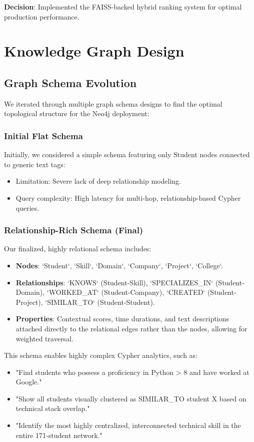 \documentclass[12pt,a4paper]{report}
\begin{document}
\textbf{Decision}: Implemented the FAISS-backed hybrid ranking system for optimal production performance.

\section{Knowledge Graph Design}

\subsection{Graph Schema Evolution}

We iterated through multiple graph schema designs to find the optimal topological structure for the Neo4j deployment:

\subsubsection{Initial Flat Schema}
Initially, we considered a simple schema featuring only Student nodes connected to generic text tags:
\begin{itemize}
    \item Limitation: Severe lack of deep relationship modeling.
    \item Query complexity: High latency for multi-hop, relationship-based Cypher queries.
\end{itemize}

\subsubsection{Relationship-Rich Schema (Final)}
Our finalized, highly relational schema includes:
\begin{itemize}
    \item \textbf{Nodes}: `Student`, `Skill`, `Domain`, `Company`, `Project`, `College`.
    \item \textbf{Relationships}: `KNOWS` (Student-Skill), `SPECIALIZES\_IN` (Student-Domain), `WORKED\_AT` (Student-Company), `CREATED` (Student-Project), `SIMILAR\_TO` (Student-Student).
    \item \textbf{Properties}: Contextual scores, time durations, and text descriptions attached directly to the relational edges rather than the nodes, allowing for weighted traversal.
\end{itemize}

This schema enables highly complex Cypher analytics, such as:
\begin{itemize}
    \item "Find students who possess a proficiency in Python > 8 and have worked at Google."
    \item "Show all students visually clustered as SIMILAR\_TO student X based on technical stack overlap."
    \item "Identify the most highly centralized, interconnected technical skill in the entire 171-student network."
\end{itemize}
\end{document}

